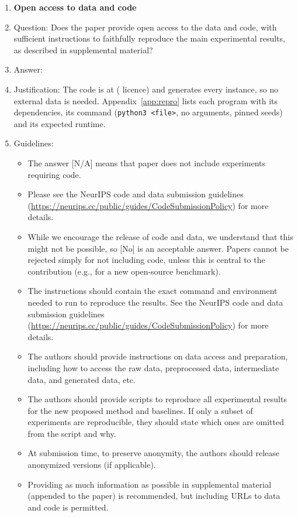 \begin{enumerate}
\item {\bf Open access to data and code}
    \item[] Question: Does the paper provide open access to the data and code, with sufficient instructions to faithfully reproduce the main experimental results, as described in supplemental material?
    \item[] Answer: \answerYes{}
    \item[] Justification: The code is at \coderepo{} (\codelicence{} licence) and generates every instance, so no external data is needed. Appendix~\ref{app:repro} lists each program with its dependencies, its command (\texttt{python3 <file>}, no arguments, pinned seeds) and its expected runtime.
    \item[] Guidelines:
    \begin{itemize}
        \item The answer [N/A] means that paper does not include experiments requiring code.
        \item Please see the NeurIPS code and data submission guidelines (\url{https://neurips.cc/public/guides/CodeSubmissionPolicy}) for more details.
        \item While we encourage the release of code and data, we understand that this might not be possible, so [No] is an acceptable answer. Papers cannot be rejected simply for not including code, unless this is central to the contribution (e.g., for a new open-source benchmark).
        \item The instructions should contain the exact command and environment needed to run to reproduce the results. See the NeurIPS code and data submission guidelines (\url{https://neurips.cc/public/guides/CodeSubmissionPolicy}) for more details.
        \item The authors should provide instructions on data access and preparation, including how to access the raw data, preprocessed data, intermediate data, and generated data, etc.
        \item The authors should provide scripts to reproduce all experimental results for the new proposed method and baselines. If only a subset of experiments are reproducible, they should state which ones are omitted from the script and why.
        \item At submission time, to preserve anonymity, the authors should release anonymized versions (if applicable).
        \item Providing as much information as possible in supplemental material (appended to the paper) is recommended, but including URLs to data and code is permitted.
    \end{itemize}


\end{enumerate}
